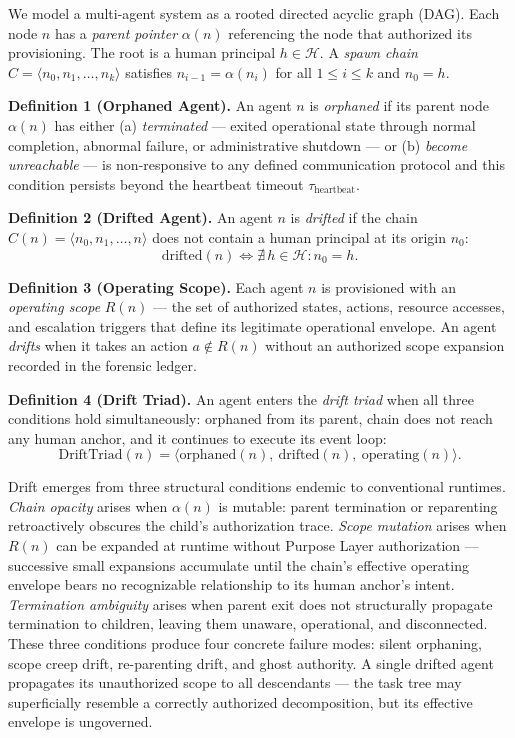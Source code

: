 We model a multi-agent system as a rooted directed acyclic graph (DAG). Each node $n$ has a \emph{parent pointer} $\alpha(n)$ referencing the node that authorized its provisioning. The root is a human principal $h \in \mathcal{H}$. A \emph{spawn chain} $C = \langle n_0, n_1, \ldots, n_k \rangle$ satisfies $n_{i-1} = \alpha(n_i)$ for all $1 \leq i \leq k$ and $n_0 = h$.

\medskip
\noindent\textbf{Definition 1 (Orphaned Agent).} An agent $n$ is \emph{orphaned} if its parent node $\alpha(n)$ has either (a) \emph{terminated} — exited operational state through normal completion, abnormal failure, or administrative shutdown — or (b) \emph{become unreachable} — is non-responsive to any defined communication protocol and this condition persists beyond the heartbeat timeout $\tau_{\text{heartbeat}}$.

\medskip
\noindent\textbf{Definition 2 (Drifted Agent).} An agent $n$ is \emph{drifted} if the chain $C(n) = \langle n_0, n_1, \ldots, n \rangle$ does not contain a human principal at its origin $n_0$:
\begin{equation}
\text{drifted}(n) \iff \nexists\, h \in \mathcal{H} : n_0 = h.
\label{eq:intro-drifted}
\end{equation}

\medskip
\noindent\textbf{Definition 3 (Operating Scope).} Each agent $n$ is provisioned with an \emph{operating scope} $R(n)$ — the set of authorized states, actions, resource accesses, and escalation triggers that define its legitimate operational envelope. An agent \emph{drifts} when it takes an action $a \notin R(n)$ without an authorized scope expansion recorded in the forensic ledger.

\medskip
\noindent\textbf{Definition 4 (Drift Triad).} An agent enters the \emph{drift triad} when all three conditions hold simultaneously: orphaned from its parent, chain does not reach any human anchor, and it continues to execute its event loop:
\begin{equation}
\text{DriftTriad}(n) = \bigl\langle \text{orphaned}(n),\ \text{drifted}(n),\ \text{operating}(n) \bigr\rangle.
\label{eq:intro-drift-triad}
\end{equation}

Drift emerges from three structural conditions endemic to conventional runtimes. \emph{Chain opacity} arises when $\alpha(n)$ is mutable: parent termination or reparenting retroactively obscures the child's authorization trace. \emph{Scope mutation} arises when $R(n)$ can be expanded at runtime without Purpose Layer authorization — successive small expansions accumulate until the chain's effective operating envelope bears no recognizable relationship to its human anchor's intent. \emph{Termination ambiguity} arises when parent exit does not structurally propagate termination to children, leaving them unaware, operational, and disconnected. These three conditions produce four concrete failure modes: silent orphaning, scope creep drift, re-parenting drift, and ghost authority. A single drifted agent propagates its unauthorized scope to all descendants — the task tree may superficially resemble a correctly authorized decomposition, but its effective envelope is ungoverned.

